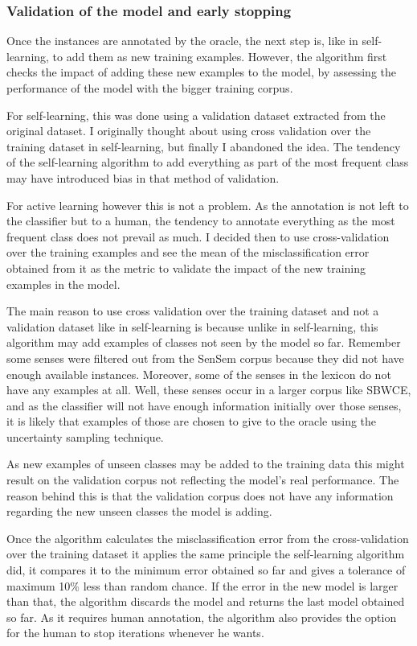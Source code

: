 \subsubsection{Validation of the model and early stopping}

Once the instances are annotated by the oracle, the next step is, like in
self-learning, to add them as new training examples. However, the algorithm
first checks the impact of adding these new examples to the model, by assessing
the performance of the model with the bigger training corpus.

For self-learning, this was done using a validation dataset extracted from the
original dataset. I originally thought about using cross validation over the
training dataset in self-learning, but finally I abandoned the idea. The
tendency of the self-learning algorithm to add everything as part of the most
frequent class may have introduced bias in that method of validation.

For active learning however this is not a problem. As the annotation is not
left to the classifier but to a human, the tendency to annotate everything as
the most frequent class does not prevail as much. I decided then to use
cross-validation over the training examples and see the mean of the
misclassification error obtained from it as the metric to validate the impact
of the new training examples in the model. 

The main reason to use cross validation over the training dataset and not a
validation dataset like in self-learning is because unlike in self-learning,
this algorithm may add examples of classes not seen by the model so far.
Remember some senses were filtered out from the SenSem corpus because they did
not have enough available instances. Moreover, some of the senses in the
lexicon do not have any examples at all. Well, these senses occur in a larger
corpus like SBWCE, and as the classifier will not have enough information
initially over those senses, it is likely that examples of those are chosen to
give to the oracle using the uncertainty sampling technique.

As new examples of unseen classes may be added to the training data this might
result on the validation corpus not reflecting the model's real performance.
The reason behind this is that the validation corpus does not have any
information regarding the new unseen classes the model is adding.

Once the algorithm calculates the misclassification error from the
cross-validation over the training dataset it applies the same principle the
self-learning algorithm did, it compares it to the minimum error obtained so
far and gives a tolerance of maximum 10\% less than random chance. If the error
in the new model is larger than that, the algorithm discards the model and
returns the last model obtained so far. As it requires human annotation, the
algorithm also provides the option for the human to stop iterations whenever he
wants.

